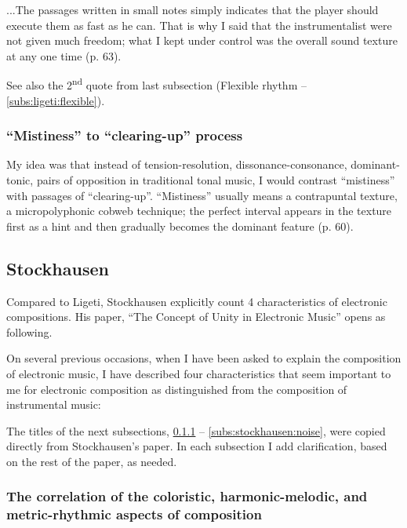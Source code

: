 \documentclass[a4paper,11pt]{article}
\newenvironment{MyShadequote}[1][]{%
    \ignorespaces%
    \begin{mdframed}[style=MyShadeQuoteStyle,#1]%
}{%
    \end{mdframed}%
    \ignorespacesafterend%
}%
\begin{document}
\begin{MyShadequote}
  ...The passages written in small notes simply indicates that the player should execute them as fast as he can.
  That is why I said that the instrumentalist were not given much freedom; what I kept under control was the overall sound texture at any one time (p. 63).
\end{MyShadequote}

See also the 2\textsuperscript{nd} quote from last subsection (Flexible rhythm -- \ref{subs:ligeti:flexible}).

\subsubsection{``Mistiness'' to ``clearing-up'' process}
\label{subs:ligeti:mistiness}

\begin{MyShadequote}
  My idea was that instead of tension-resolution, dissonance-consonance, dominant-tonic, pairs of opposition in traditional tonal music, I would contrast ``mistiness'' with passages of ``clearing-up''. ``Mistiness'' usually means a contrapuntal texture, a micropolyphonic cobweb technique; the perfect interval appears in the texture first as a hint and then gradually becomes the dominant feature (p. 60).
\end{MyShadequote}

\subsection{Stockhausen}
\label{sub:eshtetic_stockhausen}

Compared to Ligeti, Stockhausen explicitly count 4 characteristics of electronic compositions.
His paper, ``The Concept of Unity in Electronic Music'' opens as following.

\begin{MyShadequote}
  On several previous occasions, when I have been asked to explain the composition of electronic music, I have described four characteristics that seem important to me for electronic composition as distinguished from the composition of instrumental music:
\end{MyShadequote}

The titles of the next subsections, \ref{subs:stockhausen:time} -- \ref{subs:stockhausen:noise}, were copied directly from Stockhausen's paper.
In each subsection I add clarification, based on the rest of the paper, as needed.

\subsubsection{The correlation of the coloristic, harmonic-melodic, and metric-rhythmic aspects of composition}
\label{subs:stockhausen:time}
\end{document}
